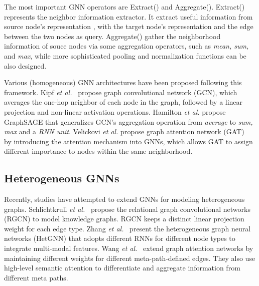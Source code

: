 \documentclass[sigconf]{acmart}
\theoremstyle{definition}
\begin{document}
The most important GNN operators are Extract() and Aggregate(). 
Extract() represents the neighbor information extractor. 
It extract useful information from source node's representation , with the target node's representation  and the edge  between the two nodes as query. 
Aggregate() gather the neighborhood information of souce nodes via some aggregation operators, such as \textit{mean, sum,} and \textit{max}, while more sophisticated pooling and normalization functions can be also designed.

Various (homogeneous) GNN architectures have been proposed following this framework.  
Kipf \textit{et al.}~\cite{gcn} propose graph convolutional network (GCN), which averages the one-hop neighbor of each node in the graph, followed by a linear projection and non-linear activation operations. 
Hamilton  \textit{et al.} propose GraphSAGE that generalizes GCN's aggregation operation from \textit{average} to \textit{sum, max} and a \textit{RNN unit}. 
Velickovi  \textit{et al.} propose graph attention network (GAT)~\cite{gat} by introducing the attention mechanism into GNNs, which allows GAT to assign different importance to nodes within the same neighborhood. 



\subsection{Heterogeneous GNNs}
Recently, studies have attempted to extend GNNs for modeling heterogeneous graphs. 
Schlichtkrull \textit{et al.}~\cite{DBLP:conf/esws/SchlichtkrullKB18} propose the relational graph convolutional networks (RGCN) to model knowledge graphs. 
RGCN keeps a distinct linear projection weight for each edge type. 
Zhang \textit{et al.}~\cite{DBLP:conf/kdd/ZhangSHSC19} present the heterogeneous graph neural networks (HetGNN) that adopts different RNNs for different node types to integrate multi-modal features. 
Wang \textit{et al.}~\cite{DBLP:conf/www/WangJSWYCY19} extend graph attention networks by maintaining different weights for different meta-path-defined edges. They also use high-level semantic attention to differentiate and aggregate information from different meta paths.
\end{document}
